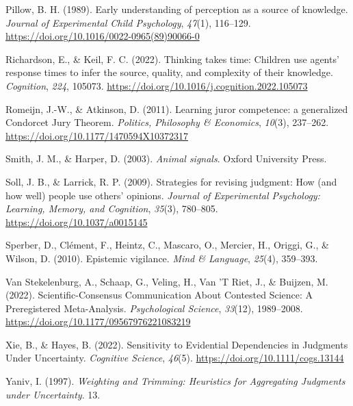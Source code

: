 \documentclass[
  doc,floatsintext]{apa6}
\newlength{\cslhangindent}
\newenvironment{CSLReferences}[2] %
 {\begin{list}{}{%
  \setlength{\itemindent}{0pt}
  \setlength{\leftmargin}{0pt}
  \setlength{\parsep}{0pt}
  \ifodd #1
   \setlength{\leftmargin}{\cslhangindent}
   \setlength{\itemindent}{-1\cslhangindent}
  \fi
  \setlength{\itemsep}{#2\baselineskip}}}
 {\end{list}}
\begin{document}
\begin{CSLReferences}{1}{0}
Pillow, B. H. (1989). Early understanding of perception as a source of knowledge. \emph{Journal of Experimental Child Psychology}, \emph{47}(1), 116--129. \url{https://doi.org/10.1016/0022-0965(89)90066-0}

Richardson, E., \& Keil, F. C. (2022). Thinking takes time: Children use agents' response times to infer the source, quality, and complexity of their knowledge. \emph{Cognition}, \emph{224}, 105073. \url{https://doi.org/10.1016/j.cognition.2022.105073}

Romeijn, J.-W., \& Atkinson, D. (2011). Learning juror competence: a generalized Condorcet Jury Theorem. \emph{Politics, Philosophy \& Economics}, \emph{10}(3), 237--262. \url{https://doi.org/10.1177/1470594X10372317}

Smith, J. M., \& Harper, D. (2003). \emph{Animal signals}. Oxford University Press.

Soll, J. B., \& Larrick, R. P. (2009). Strategies for revising judgment: How (and how well) people use others{'} opinions. \emph{Journal of Experimental Psychology: Learning, Memory, and Cognition}, \emph{35}(3), 780--805. \url{https://doi.org/10.1037/a0015145}

Sperber, D., Clément, F., Heintz, C., Mascaro, O., Mercier, H., Origgi, G., \& Wilson, D. (2010). Epistemic vigilance. \emph{Mind \& Language}, \emph{25}(4), 359--393.

Van Stekelenburg, A., Schaap, G., Veling, H., Van 'T Riet, J., \& Buijzen, M. (2022). Scientific-Consensus Communication About Contested Science: A Preregistered Meta-Analysis. \emph{Psychological Science}, \emph{33}(12), 1989--2008. \url{https://doi.org/10.1177/09567976221083219}

Xie, B., \& Hayes, B. (2022). Sensitivity to Evidential Dependencies in Judgments Under Uncertainty. \emph{Cognitive Science}, \emph{46}(5). \url{https://doi.org/10.1111/cogs.13144}

Yaniv, I. (1997). \emph{Weighting and Trimming: Heuristics for Aggregating Judgments under Uncertainty}. 13.


\end{CSLReferences}
\end{document}
